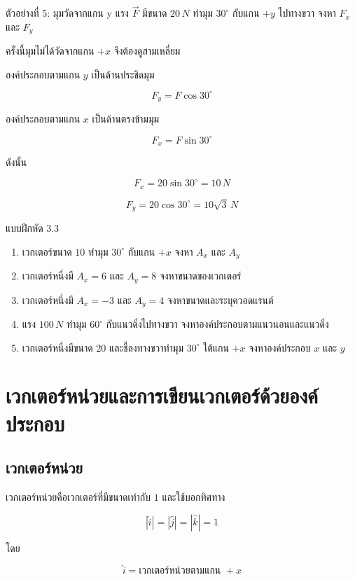 \begin{examplebox}{ตัวอย่างที่ 5: มุมวัดจากแกน y}
แรง $\vec{F}$ มีขนาด $20\,\si{N}$ ทำมุม $30^\circ$ กับแกน $+y$ ไปทางขวา จงหา $F_x$ และ $F_y$

ครั้งนี้มุมไม่ได้วัดจากแกน $+x$ จึงต้องดูสามเหลี่ยม

องค์ประกอบตามแกน $y$ เป็นด้านประชิดมุม

\[
F_y=F\cos30^\circ
\]

องค์ประกอบตามแกน $x$ เป็นด้านตรงข้ามมุม

\[
F_x=F\sin30^\circ
\]

ดังนั้น

\[
F_x=20\sin30^\circ=10\,\si{N}
\]

\[
F_y=20\cos30^\circ=10\sqrt{3}\,\si{N}
\]
\end{examplebox}

\begin{exercisebox}{แบบฝึกหัด 3.3}
\begin{enumerate}
    \item เวกเตอร์ขนาด $10$ ทำมุม $30^\circ$ กับแกน $+x$ จงหา $A_x$ และ $A_y$
    \item เวกเตอร์หนึ่งมี $A_x=6$ และ $A_y=8$ จงหาขนาดของเวกเตอร์
    \item เวกเตอร์หนึ่งมี $A_x=-3$ และ $A_y=4$ จงหาขนาดและระบุควอดแรนต์
    \item แรง $100\,\si{N}$ ทำมุม $60^\circ$ กับแนวดิ่งไปทางขวา จงหาองค์ประกอบตามแนวนอนและแนวดิ่ง
    \item เวกเตอร์หนึ่งมีขนาด $20$ และชี้ลงทางขวาทำมุม $30^\circ$ ใต้แกน $+x$ จงหาองค์ประกอบ $x$ และ $y$
\end{enumerate}
\end{exercisebox}

\section{เวกเตอร์หน่วยและการเขียนเวกเตอร์ด้วยองค์ประกอบ}

\subsection{เวกเตอร์หน่วย}

เวกเตอร์หน่วยคือเวกเตอร์ที่มีขนาดเท่ากับ $1$ และใช้บอกทิศทาง

\[
|\hat{i}|=|\hat{j}|=|\hat{k}|=1
\]

โดย

\[
\hat{i}=\text{เวกเตอร์หน่วยตามแกน }+x
\]

